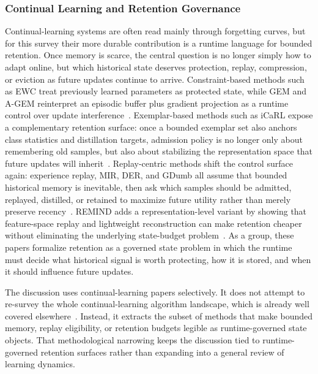 \documentclass[acmsmall,screen,review]{acmart}
\begin{document}
\subsubsection{Continual Learning and Retention Governance}

Continual-learning systems are often read mainly through forgetting curves, but for this survey their more durable contribution is a runtime language for bounded retention. Once memory is scarce, the central question is no longer simply how to adapt online, but which historical state deserves protection, replay, compression, or eviction as future updates continue to arrive. Constraint-based methods such as EWC treat previously learned parameters as protected state, while GEM and A-GEM reinterpret an episodic buffer plus gradient projection as a runtime control over update interference~\cite{kirkpatrick2017ewc,lopez2017gem,chaudhry2019agem}. Exemplar-based methods such as iCaRL expose a complementary retention surface: once a bounded exemplar set also anchors class statistics and distillation targets, admission policy is no longer only about remembering old samples, but also about stabilizing the representation space that future updates will inherit~\cite{rebuffi2017icarl}. Replay-centric methods shift the control surface again: experience replay, MIR, DER, and GDumb all assume that bounded historical memory is inevitable, then ask which samples should be admitted, replayed, distilled, or retained to maximize future utility rather than merely preserve recency~\cite{rolnick2019experience,aljundi2019mir,buzzega2020der,prabhu2020gdumb}. REMIND adds a representation-level variant by showing that feature-space replay and lightweight reconstruction can make retention cheaper without eliminating the underlying state-budget problem~\cite{hayes2020remind}. As a group, these papers formalize retention as a governed state problem in which the runtime must decide what historical signal is worth protecting, how it is stored, and when it should influence future updates.

The discussion uses continual-learning papers selectively. It does not attempt to re-survey the whole continual-learning algorithm landscape, which is already well covered elsewhere~\cite{delange2021survey}. Instead, it extracts the subset of methods that make bounded memory, replay eligibility, or retention budgets legible as runtime-governed state objects. That methodological narrowing keeps the discussion tied to runtime-governed retention surfaces rather than expanding into a general review of learning dynamics.
\end{document}
